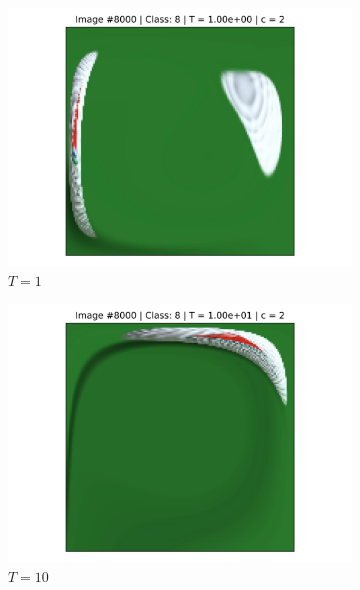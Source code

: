 \begin{figure}[!h]
\begin{subfigure}{0.18\textwidth}
    \includegraphics[width=\textwidth]{ch1-diffy/figures/warping_examples/8000_0_1.png}
    \caption{$T=1$}
    \end{subfigure}
    \begin{subfigure}{0.18\textwidth}
    \includegraphics[width=\textwidth]{ch1-diffy/figures/warping_examples/8000_-1_1.png}
    \caption{$T=10$}
    \end{subfigure}
    \begin{subfigure}{0.18\textwidth}

\end{subfigure}
\end{figure}
